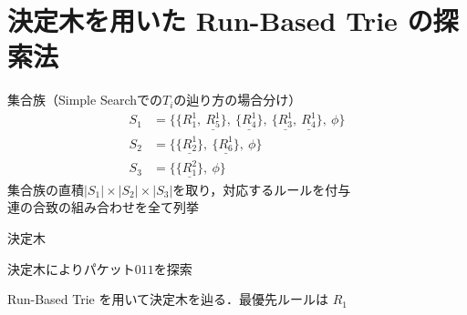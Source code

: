 \documentclass[12pt,dvipdfmx,mathserif,uplatex,aspectratio=32]{beamer}
\begin{document}
\section{決定木を用いた Run-Based Trie の探索法}

\begin{frame}{集合族（Simple Searchでの$T_{i}$の辿り方の場合分け）}
\vspace{-3mm}
\centering{
 \scalebox{0.6}{}
}
\vspace{-2mm}
 \begin{align*}
  S_{1} &= \{\{ R_{1}^{1}, \ \underline{ R_{5}^{1}} \}, \ \{ \underline{ R_{4}^{1}} \}, \ \{\underline{ R_{3}^{1}}, \ \underline{ R_{4}^{1}} \}, \ \phi \}  \\
  S_{2} &= \{ \{ \underline{ R_{2}^{1}} \}, \ \{ \underline{ R_{6}^{1}} \}, \ \phi \}  \\
  S_{3} &= \{ \{ \underline{ R_{1}^{2}} \}, \ \phi \} 
 \end{align*}
集合族の直積$|S_{1}| \times |S_{2}| \times |S_{3}|$を取り，対応するルールを付与 \\ 
\vspace{1mm}
連の合致の組み合わせを全て列挙
\end{frame}

\begin{frame}{決定木}
 \centering{
  \scalebox{0.8}{}
 }
 \par

\color{red}{Run-Based Trieに従って決定木を辿るだけで，パケットを分類可能}
\end{frame}

\begin{frame}{決定木によりパケット$011$を探索}
 \centering{
  \scalebox{0.8}{}
 }
 \par

Run-Based Trie を用いて決定木を辿る．最優先ルールは $R_{1}$
\end{frame}
\end{document}
